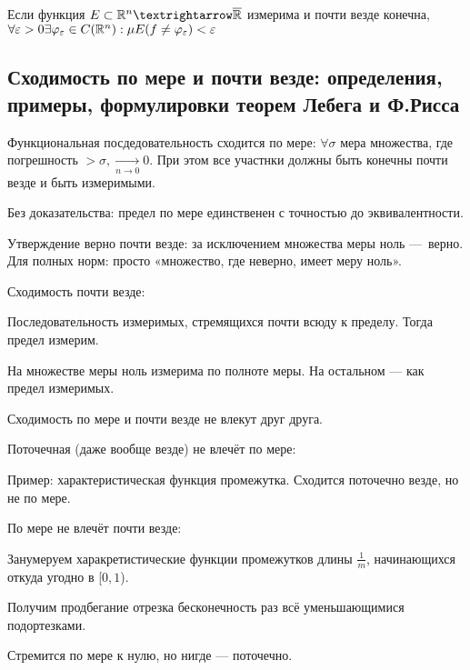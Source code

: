 \documentclass[12pt, a4paper, oneside]{memoir}
\begin{document}
\begin{theorem}

    Если функция $E \subset \sR^n → \overline{\sR}$ измерима и почти везде конечна,
    $\forall \varepsilon > 0 \exists \varphi_\varepsilon \in C({\mathbb{R}}^n): \mu E (f \neq \varphi_\varepsilon) < \varepsilon$ 
\end{theorem}


\subsection{Сходимость по мере и почти везде: определения, примеры, 
формулировки теорем Лебега и Ф.Рисса}

Функциональная посдедовательность сходится по мере:
$\forall \sigma$ мера множества, где погрешность 
$> \sigma, \underset{n → 0}{\longrightarrow} 0$. При этом все участнки должны быть конечны почти везде и быть измеримыми.

Без доказательства: предел по мере единственен с точностью до эквивалентности.

Утверждение верно почти везде: за исключением множества меры ноль — верно.
Для полных норм: просто «множество, где неверно, имеет меру ноль».

Сходимость почти везде: 

\begin{claim}
    Последовательность измеримых, стремящихся почти всюду к пределу. Тогда предел измерим.

    На множестве меры ноль измерима по полноте меры.
    На остальном — как предел измеримых.
\end{claim}

Сходимость по мере и почти везде не влекут друг друга.

\begin{example}
    Поточечная (даже вообще везде) не влечёт по мере:

    Пример: характеристическая функция промежутка. Сходится поточечно везде, но не по мере.
\end{example}

\begin{example}
    По мере не влечёт почти везде: 
    
    Занумеруем харакретистические функции промежутков длины $\frac{1}{m}$,
    начинающихся откуда угодно в [$0, 1$).

    Получим продбегание отрезка бесконечность раз всё уменьшающимися подортезками.

    Стремится по мере к нулю, но нигде — поточечно.
\end{example}
\end{document}
